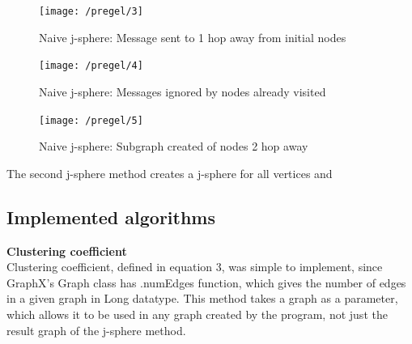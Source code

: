 \documentclass{article}
\theoremstyle{definition}
\begin{document}
\begin{figure}[H]
\centering
\texttt{[image: /pregel/3]}
\caption{Naive j-sphere: Message sent to 1 hop away from initial nodes}
\end{figure}

\begin{figure}[H]
\centering
\texttt{[image: /pregel/4]}
\caption{Naive j-sphere: Messages ignored by nodes already visited}
\end{figure}

\begin{figure}[H]
\centering
\texttt{[image: /pregel/5]}
\caption{Naive j-sphere: Subgraph created of nodes 2 hop away}
\end{figure}

The second j-sphere method creates a j-sphere for all vertices and 

\subsection{Implemented algorithms}

\textbf{Clustering coefficient} \\
Clustering coefficient, defined in equation 3, was simple to implement, since GraphX's Graph class has .numEdges function, which gives the number of edges in a given graph in Long datatype. This method takes a graph as a parameter, which allows it to be used in any graph created by the program, not just the result graph of the j-sphere method. \\

\textbf{}

\textbf{}

\textbf{}
\end{document}
